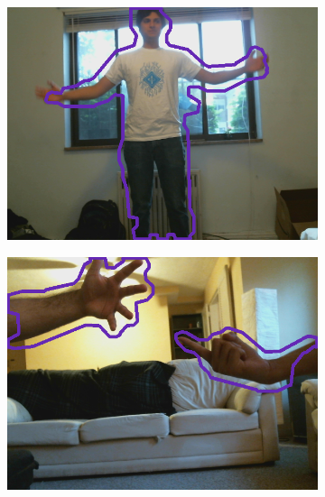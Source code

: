 \documentclass[10pt,twocolumn,letterpaper]{article}
\begin{document}
\begin{figure}
    \centering
    \begin{subfigure}[t]{0.23\textwidth}
        \centering
        \includegraphics[width=\textwidth]{images/live_video1}
    \end{subfigure}
    \begin{subfigure}[t]{0.23\textwidth}
        \centering
        \includegraphics[width=\textwidth]{images/live_video2}
    \end{subfigure}
    \begin{subfigure}[t]{0.23\textwidth}
        \centering

\end{subfigure}
\end{figure}
\end{document}
